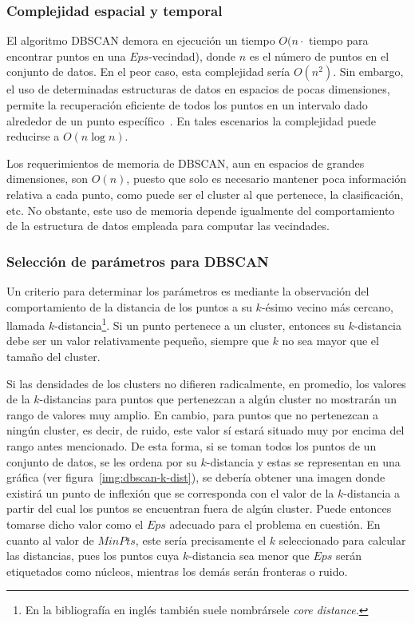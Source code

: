 \subsubsection{Complejidad espacial y temporal}

El algoritmo DBSCAN demora en ejecución un tiempo $O(n \cdot$ tiempo para encontrar puntos en una $Eps$-vecindad), donde $n$ es el número de puntos en el conjunto de datos.
En el peor caso, esta complejidad sería $O(n^2)$.
Sin embargo, el uso de determinadas estructuras de datos en espacios de pocas dimensiones, permite la recuperación eficiente de todos los puntos en un intervalo dado alrededor de un punto específico~\cite{Tan05}.
En tales escenarios la complejidad puede reducirse a $O(n\log n)$.

Los requerimientos de memoria de DBSCAN, aun en espacios de grandes dimensiones, son $O(n)$, puesto que solo es necesario mantener poca información relativa a cada punto, como puede ser el cluster al que pertenece, la clasificación, etc.
No obstante, este uso de memoria depende igualmente del comportamiento de la estructura de datos empleada para computar las vecindades.

\subsubsection{Selección de parámetros para DBSCAN}\label{subsubsec:paramsDBSCAN}

Un criterio para determinar los parámetros es mediante la observación del comportamiento de la distancia de los puntos a su $k$-ésimo vecino más cercano, llamada $k$-distancia\footnote{En la bibliografía en inglés también suele nombrársele \textit{core distance}.}.
Si un punto pertenece a un cluster, entonces su $k$-distancia debe ser un valor relativamente pequeño, siempre que $k$ no sea mayor que el tamaño del cluster.

Si las densidades de los clusters no difieren radicalmente, en promedio, los valores de la $k$-distancias para puntos que pertenezcan a algún cluster no mostrarán un rango de valores muy amplio.
En cambio, para puntos que no pertenezcan a ningún cluster, es decir, de ruido, este valor sí estará situado muy por encima del rango antes mencionado.
De esta forma, si se toman todos los puntos de un conjunto de datos, se les ordena por su $k$-distancia y estas se representan en una gráfica (ver figura~\ref{img:dbscan-k-dist}), se debería obtener una imagen donde existirá un punto de inflexión que se corresponda con el valor de la $k$-distancia a partir del cual los puntos se encuentran fuera de algún cluster.
Puede entonces tomarse dicho valor como el $Eps$ adecuado para el problema en cuestión.
En cuanto al valor de $MinPts$, este sería precisamente el $k$ seleccionado para calcular las distancias, pues los puntos cuya $k$-distancia sea menor que $Eps$ serán etiquetados como núcleos, mientras los demás serán fronteras o ruido.

